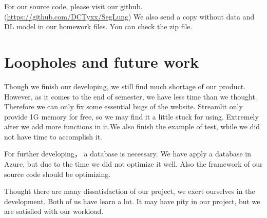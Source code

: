 \documentclass[
]{dtuposter}
\begin{document}
\begin{dtupostercontent}
\begin{figure}
\end{figure}
For our source code, please visit our github. (\href{https://github.com/DCTyxx/SegLung}{https://github.com/DCTyxx/SegLung}) We also send a copy without data and DL model in our homework files. You can check the zip file.

\section{Loopholes and future work}
Though we finish our developing, we still find much shortage of our product. However, as it comes to the end of semester, we have less time than we thought. Therefore we can only fix some essential bugs of the website. Streamlit only provide 1G memory for free, so we may find it a little stuck for using. Extremely after we add more functions in it.We also finish the example of test, while we did not have time to accomplish it. 
\par For further developing， a database is necessary. We have apply a database in Azure, but due to the time we did not optimize it well. Also the framework of our source code should be optimizing. 
\par Thought there are many dissatisfaction of our project, we exert ourselves in the development. Both of us have learn a lot. It may have pity in our project, but we are satisfied with our workload.
\end{dtupostercontent}
\end{document}
